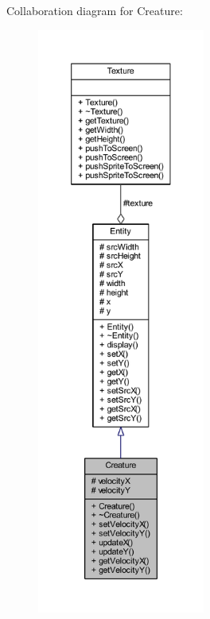Collaboration diagram for Creature\+:
\nopagebreak
\begin{figure}[H]
\begin{center}
\leavevmode
\includegraphics[height=550pt]{class_creature__coll__graph}
\end{center}
\end{figure}
